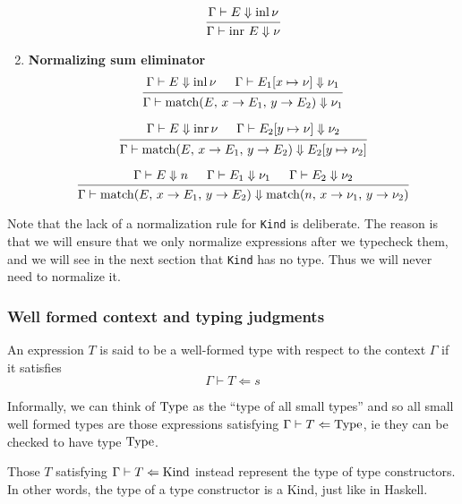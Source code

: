 \documentclass{article}
\begin{document}
\begin{enumerate}
  \[
    \begin{prooftree}
     \hypo{\Gamma \vdash E \Downarrow \inl \nu}
     \infer1{\Gamma \vdash \inr \, E \Downarrow \nu}
    \end{prooftree}  
  \]

  \item \textbf{Normalizing sum eliminator}
  \[
    \begin{prooftree}
      \hypo{\Gamma \vdash E \Downarrow \inl \nu}
      \hypo{\Gamma \vdash E_1[x \mapsto \nu] \Downarrow \nu_1}
      \infer2{\Gamma \vdash 
        \match(E, \, x \rightarrow E_1, \, y \rightarrow E_2)
        \Downarrow \nu_1}
    \end{prooftree}  
  \]

  \[
   \begin{prooftree}
     \hypo{\Gamma \vdash E \Downarrow \inr \nu}
     \hypo{\Gamma \vdash E_2[y \mapsto \nu] \Downarrow \nu_2}
     \infer2{\Gamma \vdash 
       \match(E, \, x \rightarrow E_1, \, y \rightarrow E_2)
       \Downarrow E_2[y \mapsto \nu_2]}
   \end{prooftree}  
  \]

  \[
   \begin{prooftree}
    \hypo{\Gamma \vdash E \Downarrow n}
      \hypo{\Gamma \vdash E_1 \Downarrow \nu_1}
      \hypo{\Gamma \vdash E_2 \Downarrow \nu_2}
      \infer3{\Gamma \vdash \match(E, \, x \rightarrow E_1, \, y \rightarrow E_2) 
               \Downarrow
               \match(n, \, x \rightarrow \nu_1, \, y \rightarrow \nu_2) 
               }
   \end{prooftree}  
  \]

\end{enumerate}

Note that the lack of a normalization rule for \verb|Kind| is deliberate.
The reason is that we will ensure that we only normalize expressions after we
typecheck them, and we will see in the next section that \verb|Kind| has no
type. Thus we will never need to normalize it.

\subsubsection{Well formed context and typing judgments}
\begin{definition} 
  An expression $T$ is said to be a well-formed type with respect to the context
  $\Gamma$ if it satisfies
  \[ \Gamma \vdash T \Leftarrow s \]

  Informally, we can think of $\operatorname{Type}$ as the ``type of all small types'' and so
  all small well formed types are those expressions satisfying
  $\Gamma \vdash T \Leftarrow \operatorname{Type}$, ie they can be checked to have type $\operatorname{Type}$.

  Those $T$ satisfying $\Gamma \vdash T \Leftarrow \operatorname{Kind}$ instead represent the
  type of type constructors. In other words, the type of a type constructor is a
  Kind, just like in Haskell. 
\end{definition}
\end{document}
